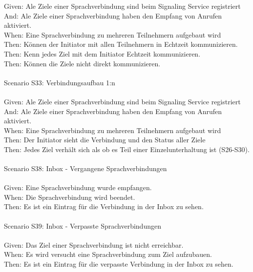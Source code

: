 \begin{tabbing}
    Given:  \> \> \> Ale Ziele einer Sprachverbindung sind beim Signaling Service registriert\\
    And:  \> \> \> Ale Ziele einer Sprachverbindung haben den Empfang von Anrufen aktiviert.\\
    When:   \> \> \> Eine Sprachverbindung zu mehreren Teilnehmern aufgebaut wird\\
    Then:   \> \> \> Können der Initiator mit allen Teilnehmern in Echtzeit kommunizieren.\\
    Then:   \> \> \> Kenn jedes Ziel mit dem Initiator Echtzeit kommunizieren.\\
    Then:   \> \> \> Können die Ziele nicht direkt kommunizieren.\\
    \\
    Scenario S33: \> \> \> Verbindungsaufbau 1:n  \\ \\
    Given:  \> \> \> Ale Ziele einer Sprachverbindung sind beim Signaling Service registriert\\
    And:  \> \> \> Ale Ziele einer Sprachverbindung haben den Empfang von Anrufen aktiviert.\\
    When:   \> \> \> Eine Sprachverbindung zu mehreren Teilnehmern aufgebaut wird\\
    Then:   \> \> \> Der Initiator sieht die Verbindung und den Status aller Ziele \\
    Then:   \> \> \> Jedes Ziel verhält sich als ob es Teil einer Einzelunterhaltung ist (S26-S30).\\
    \\
    Scenario S38: \> \> \> Inbox - Vergangene Sprachverbindungen \\ \\
    Given:  \> \> \> Eine Sprachverbindung wurde empfangen. \\
    When:   \> \> \> Die Sprachverbindung wird beendet.  \\
    Then:   \> \> \> Es ist ein Eintrag für die Verbindung in der Inbox zu sehen. \\
    \\
    Scenario S39: \> \> \> Inbox - Verpasste Sprachverbindungen \\ \\
    Given:  \> \> \> Das Ziel einer Sprachverbindung ist nicht erreichbar. \\
    When:   \> \> \> Es wird versucht eine Sprachverbindung zum Ziel aufzubauen.\\
    Then:   \> \> \> Es ist ein Eintrag für die verpasste Verbindung in der Inbox zu sehen.\\

\end{tabbing}
